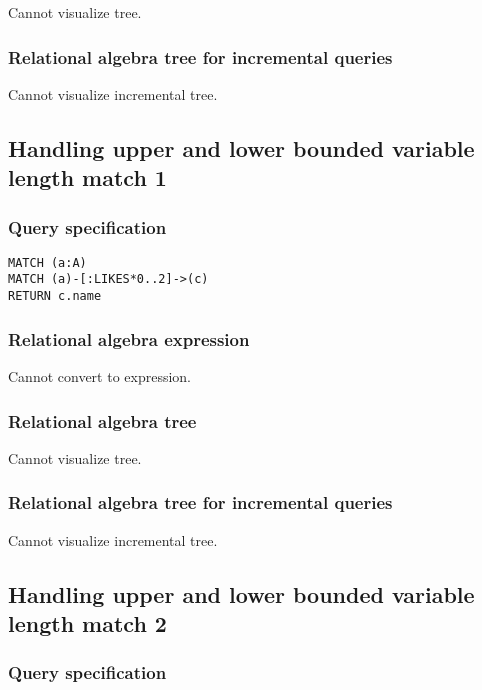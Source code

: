 Cannot visualize tree.

\subsubsection*{Relational algebra tree for incremental queries}

Cannot visualize incremental tree.

\subsection{Handling upper and lower bounded variable length match 1}

\subsubsection*{Query specification}

\begin{lstlisting}
MATCH (a:A)
MATCH (a)-[:LIKES*0..2]->(c)
RETURN c.name
\end{lstlisting}

\subsubsection*{Relational algebra expression}

Cannot convert to expression.

\subsubsection*{Relational algebra tree}

Cannot visualize tree.

\subsubsection*{Relational algebra tree for incremental queries}

Cannot visualize incremental tree.

\subsection{Handling upper and lower bounded variable length match 2}

\subsubsection*{Query specification}

